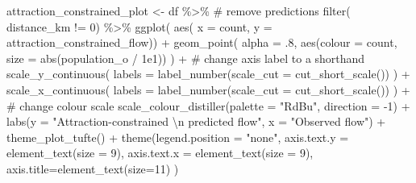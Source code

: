 \documentclass[
  a4paper, 
  twoside,
  final
]{article}
\newenvironment{Shaded}{\begin{snugshade}}{\end{snugshade}}
\newcommand{\AttributeTok}[1]{\textcolor[rgb]{0.40,0.45,0.13}{#1}}
\newcommand{\CommentTok}[1]{\textcolor[rgb]{0.37,0.37,0.37}{#1}}
\newcommand{\DecValTok}[1]{\textcolor[rgb]{0.68,0.00,0.00}{#1}}
\newcommand{\FloatTok}[1]{\textcolor[rgb]{0.68,0.00,0.00}{#1}}
\newcommand{\FunctionTok}[1]{\textcolor[rgb]{0.28,0.35,0.67}{#1}}
\newcommand{\NormalTok}[1]{\textcolor[rgb]{0.00,0.23,0.31}{#1}}
\newcommand{\OtherTok}[1]{\textcolor[rgb]{0.00,0.23,0.31}{#1}}
\newcommand{\SpecialCharTok}[1]{\textcolor[rgb]{0.37,0.37,0.37}{#1}}
\newcommand{\StringTok}[1]{\textcolor[rgb]{0.13,0.47,0.30}{#1}}
\begin{document}
\begin{Shaded}
\begin{Highlighting}[]
\NormalTok{attraction\_constrained\_plot }\OtherTok{\textless{}{-}}\NormalTok{ df }\SpecialCharTok{\%\textgreater{}\%} 
  \CommentTok{\# remove predictions}
  \FunctionTok{filter}\NormalTok{( distance\_km }\SpecialCharTok{!=} \DecValTok{0}\NormalTok{) }\SpecialCharTok{\%\textgreater{}\%} 
  \FunctionTok{ggplot}\NormalTok{( }\FunctionTok{aes}\NormalTok{( }\AttributeTok{x =}\NormalTok{ count, }\AttributeTok{y =}\NormalTok{ attraction\_constrained\_flow)) }\SpecialCharTok{+}
  \FunctionTok{geom\_point}\NormalTok{( }\AttributeTok{alpha =}\NormalTok{ .}\DecValTok{8}\NormalTok{, }\FunctionTok{aes}\NormalTok{(}\AttributeTok{colour =}\NormalTok{ count, }
                              \AttributeTok{size =} \FunctionTok{abs}\NormalTok{(population\_o }\SpecialCharTok{/} \FloatTok{1e1}\NormalTok{)) ) }\SpecialCharTok{+}
  \CommentTok{\# change axis label to a shorthand}
  \FunctionTok{scale\_y\_continuous}\NormalTok{(}
    \AttributeTok{labels =} \FunctionTok{label\_number}\NormalTok{(}\AttributeTok{scale\_cut =} \FunctionTok{cut\_short\_scale}\NormalTok{())}
\NormalTok{    ) }\SpecialCharTok{+} 
  \FunctionTok{scale\_x\_continuous}\NormalTok{(}
    \AttributeTok{labels =} \FunctionTok{label\_number}\NormalTok{(}\AttributeTok{scale\_cut =} \FunctionTok{cut\_short\_scale}\NormalTok{())}
\NormalTok{    ) }\SpecialCharTok{+} 
  \CommentTok{\# change colour scale}
  \FunctionTok{scale\_colour\_distiller}\NormalTok{(}\AttributeTok{palette =} \StringTok{"RdBu"}\NormalTok{, }\AttributeTok{direction =} \SpecialCharTok{{-}}\DecValTok{1}\NormalTok{) }\SpecialCharTok{+}
  \FunctionTok{labs}\NormalTok{(}\AttributeTok{y =} \StringTok{"Attraction{-}constrained }\SpecialCharTok{\textbackslash{}n}\StringTok{ predicted flow"}\NormalTok{,}
       \AttributeTok{x =} \StringTok{"Observed flow"}\NormalTok{) }\SpecialCharTok{+}
  \FunctionTok{theme\_plot\_tufte}\NormalTok{() }\SpecialCharTok{+}
  \FunctionTok{theme}\NormalTok{(}\AttributeTok{legend.position =} \StringTok{"none"}\NormalTok{,}
        \AttributeTok{axis.text.y =} \FunctionTok{element\_text}\NormalTok{(}\AttributeTok{size =} \DecValTok{9}\NormalTok{),}
        \AttributeTok{axis.text.x =} \FunctionTok{element\_text}\NormalTok{(}\AttributeTok{size =} \DecValTok{9}\NormalTok{),}
        \AttributeTok{axis.title=}\FunctionTok{element\_text}\NormalTok{(}\AttributeTok{size=}\DecValTok{11}\NormalTok{)}
\NormalTok{        )}


\end{Highlighting}
\end{Shaded}
\end{document}
